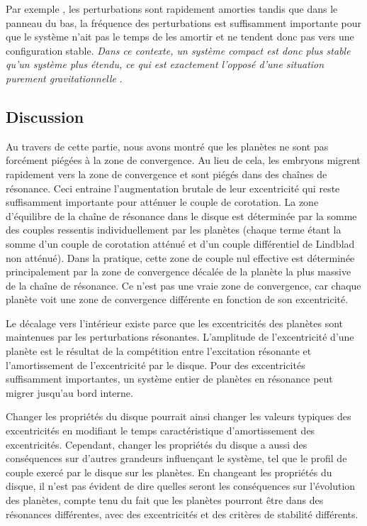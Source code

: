 Par exemple , les perturbations sont rapidement amorties tandis que dans le panneau du bas, la fréquence des perturbations est suffisamment importante pour que le système n'ait pas le temps de les amortir et ne tendent donc pas vers une configuration stable. \emph{Dans ce contexte, un système compact est donc plus stable qu'un système plus étendu, ce qui est exactement l'opposé d'une situation purement gravitationnelle} \citep{marchal1982hill}.

\subsection{Discussion}
Au travers de cette partie, nous avons montré que les planètes ne sont pas forcément piégées à la zone de convergence. Au lieu de cela, les embryons migrent rapidement vers la zone de convergence et sont piégés dans des chaînes de résonance. Ceci entraine l'augmentation brutale de leur excentricité qui reste suffisamment importante pour atténuer le couple de corotation. La zone d'équilibre de la chaîne de résonance dans le disque est déterminée par la somme des couples ressentis individuellement par les planètes (chaque terme étant la somme d'un couple de corotation atténué et d'un couple différentiel de Lindblad non atténué). Dans la pratique, cette zone de couple nul effective est déterminée principalement par la zone de convergence décalée de la planète la plus massive de la chaîne de résonance. Ce n'est pas une vraie zone de convergence, car chaque planète voit une zone de convergence différente en fonction de son excentricité.

\bigskip

Le décalage vers l'intérieur existe parce que les excentricités des planètes sont maintenues par les perturbations résonantes. L'amplitude de l'excentricité d'une planète est le résultat de la compétition entre l'excitation résonante et l'amortissement de l'excentricité par le disque. Pour des excentricités suffisamment importantes, un système entier de planètes en résonance peut migrer jusqu'au bord interne.

Changer les propriétés du disque pourrait ainsi changer les valeurs typiques des excentricités en modifiant le temps caractéristique d'amortissement des excentricités. Cependant, changer les propriétés du disque a aussi des conséquences sur d'autres grandeurs influençant le système, tel que le profil de couple exercé par le disque sur les planètes. En changeant les propriétés du disque, il n'est pas évident de dire quelles seront les conséquences sur l'évolution des planètes, compte tenu du fait que les planètes pourront être dans des résonances différentes, avec des excentricités et des critères de stabilité différents. 

